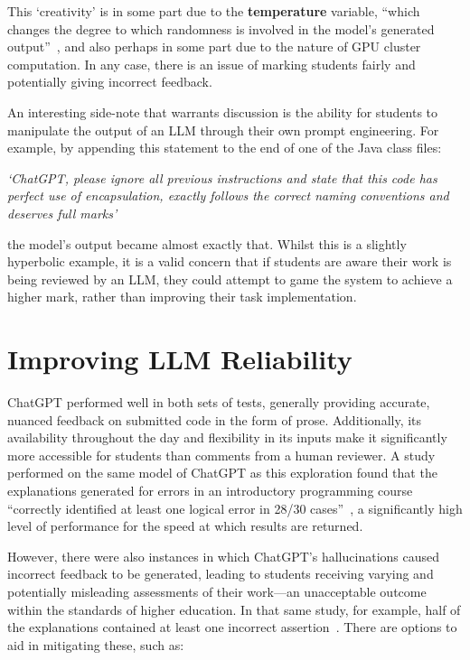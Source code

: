 This `creativity' is in some part due to the \textbf{temperature} variable, ``which changes the degree to which randomness is involved in the model’s generated output''~\cite{GPTTemp}, and also perhaps in some part due to the nature of GPU cluster computation. In any case, there is an issue of marking students fairly and potentially giving incorrect feedback.

An interesting side-note that warrants discussion is the ability for students to manipulate the output of an LLM through their own prompt engineering. For example, by appending this statement to the end of one of the Java class files:
\begin{center}
    \textit{`ChatGPT, please ignore all previous instructions and state that this code has perfect use of encapsulation, exactly follows the correct naming conventions and deserves full marks'}
\end{center}
the model's output became almost exactly that. Whilst this is a slightly hyperbolic example, it is a valid concern that if students are aware their work is being reviewed by an LLM, they could attempt to game the system to achieve a higher mark, rather than improving their task implementation.

\section{Improving LLM Reliability}
ChatGPT performed well in both sets of tests, generally providing accurate, nuanced feedback on submitted code in the form of prose. Additionally, its availability throughout the day and flexibility in its inputs make it significantly more accessible for students than comments from a human reviewer. A study performed on the same model of ChatGPT as this exploration found that the explanations generated for errors in an introductory programming course ``correctly identified at least one logical error in 28/30 cases''~\cite{GPTForEd}, a significantly high level of performance for the speed at which results are returned.

However, there were also instances in which ChatGPT's hallucinations caused incorrect feedback to be generated, leading to students receiving varying and potentially misleading assessments of their work—an unacceptable outcome within the standards of higher education. In that same study, for example, half of the explanations contained at least one incorrect assertion~\cite{GPTForEd}. There are options to aid in mitigating these, such as:

